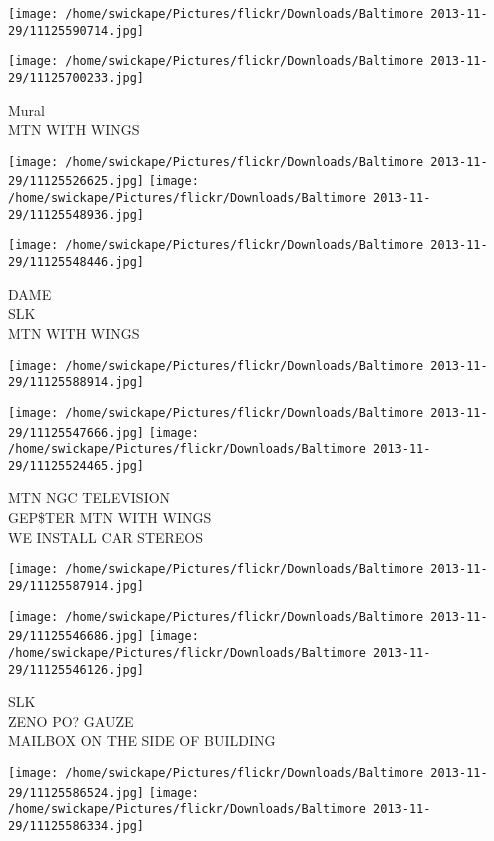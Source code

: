 \documentclass[10pt,letterpaper]{article}
\begin{document}
\texttt{[image: /home/swickape/Pictures/flickr/Downloads/Baltimore 2013-11-29/11125590714.jpg]}

\vspace{0.25in}
\texttt{[image: /home/swickape/Pictures/flickr/Downloads/Baltimore 2013-11-29/11125700233.jpg]}

Mural\\
MTN WITH WINGS\\
\pagebreak

\texttt{[image: /home/swickape/Pictures/flickr/Downloads/Baltimore 2013-11-29/11125526625.jpg]}
\texttt{[image: /home/swickape/Pictures/flickr/Downloads/Baltimore 2013-11-29/11125548936.jpg]}

\texttt{[image: /home/swickape/Pictures/flickr/Downloads/Baltimore 2013-11-29/11125548446.jpg]}

DAME\\
SLK\\
MTN WITH WINGS\\
\pagebreak

\texttt{[image: /home/swickape/Pictures/flickr/Downloads/Baltimore 2013-11-29/11125588914.jpg]}

\vspace{0.25in}
\texttt{[image: /home/swickape/Pictures/flickr/Downloads/Baltimore 2013-11-29/11125547666.jpg]}
\texttt{[image: /home/swickape/Pictures/flickr/Downloads/Baltimore 2013-11-29/11125524465.jpg]}

MTN NGC TELEVISION\\
GEP\$TER MTN WITH WINGS\\
WE INSTALL CAR STEREOS\\
\pagebreak

\texttt{[image: /home/swickape/Pictures/flickr/Downloads/Baltimore 2013-11-29/11125587914.jpg]}

\vspace{0.25in}
\texttt{[image: /home/swickape/Pictures/flickr/Downloads/Baltimore 2013-11-29/11125546686.jpg]}
\texttt{[image: /home/swickape/Pictures/flickr/Downloads/Baltimore 2013-11-29/11125546126.jpg]}

SLK\\
ZENO PO? GAUZE\\
MAILBOX ON THE SIDE OF BUILDING\\
\pagebreak

\texttt{[image: /home/swickape/Pictures/flickr/Downloads/Baltimore 2013-11-29/11125586524.jpg]}
\texttt{[image: /home/swickape/Pictures/flickr/Downloads/Baltimore 2013-11-29/11125586334.jpg]}
\end{document}
